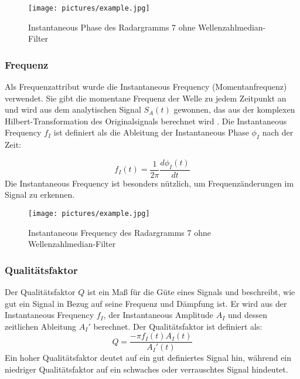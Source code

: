 \begin{figure}[H]
    \centering
    \texttt{[image: pictures/example.jpg]}
    \caption{Instantaneous Phase des Radargramms 7 ohne Wellenzahlmedian-Filter}
    \label{fig:inst_phase}
\end{figure}

\subsubsection{Frequenz}

Als Frequenzattribut wurde die Instantaneous Frequency (Momentanfrequenz) \parencite{taner_complex_1979} verwendet. Sie gibt die momentane Frequenz der Welle zu jedem Zeitpunkt an und wird aus dem analytischen Signal $S_A(t)$ gewonnen, das aus der komplexen Hilbert-Transformation des Originalsignals berechnet wird \parencite[S. 177]{sheriff_encyclopedic_2002}. Die Instantaneous Frequency $f_I$ ist definiert als die Ableitung der Instantaneous Phase $\phi_I$ nach der Zeit:

\begin{equation}
    f_I(t) = \frac{1}{2\pi} \frac{d\phi_I(t)}{dt}
\end{equation}
Die Instantaneous Frequency ist besonders nützlich, um Frequenzänderungen im Signal zu erkennen.

\begin{figure}[H]
    \centering
    \texttt{[image: pictures/example.jpg]}
    \caption{Instantaneous Frequency des Radargramms 7 ohne Wellenzahlmedian-Filter}
    \label{fig:inst_freq}
\end{figure}

\subsubsection{Qualitätsfaktor}

Der Qualitätsfaktor $Q$ \parencite{noauthor_instantaneous_2024} ist ein Maß für die Güte eines Signals und beschreibt, wie gut ein Signal in Bezug auf seine Frequenz und Dämpfung ist. Er wird aus der Instantaneous Frequency $f_I$, der Instantaneous Amplitude $A_I$ und dessen zeitlichen Ableitung $A_I'$ berechnet. Der Qualitätsfaktor ist definiert als: \\

\begin{equation}
    Q = \frac{-\pi f_I(t) A_I(t)}{A_I'(t)}
\end{equation}
Ein hoher Qualitätsfaktor deutet auf ein gut definiertes Signal hin, während ein niedriger Qualitätsfaktor auf ein schwaches oder verrauschtes Signal hindeutet.

